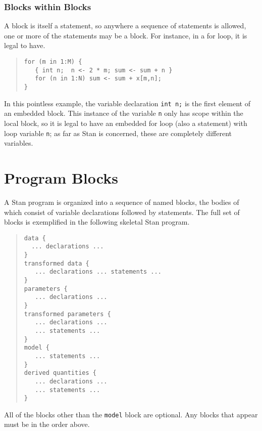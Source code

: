 \documentclass[10pt]{report}
\newcommand{\Stan}{Stan\xspace}
\newcommand{\code}[1]{{\tt #1}}
\begin{document}
\subsection{Blocks within Blocks}

A block is itself a statement, so anywhere a sequence of statements is
allowed, one or more of the statements may be a block.  For instance,
in a for loop, it is legal to have.
%
\begin{quote}
\begin{Verbatim}
for (m in 1:M) {
   { int n;  n <- 2 * m; sum <- sum + n }
   for (n in 1:N) sum <- sum + x[m,n];
}
\end{Verbatim}
\end{quote}
%
In this pointless example, the variable declaration \code{int n;} is
the first element of an embedded block.  This instance of the variable
\code{n} only has scope within the local block, so it is legal to have
an embedded for loop (also a statement) with loop variable \code{n};
as far as \Stan is concerned, these are completely different
variables.



\chapter{Program Blocks}\label{blocks.chapter}

A \Stan program is organized into a sequence of named blocks, the
bodies of which consist of variable declarations followed by
statements.  The full set of blocks is exemplified in the following
skeletal \Stan program.
%
\begin{quote}
\begin{Verbatim} 
data { 
  ... declarations ...
}
transformed data { 
   ... declarations ... statements ... 
}
parameters { 
   ... declarations ... 
}
transformed parameters { 
   ... declarations ...
   ... statements ...
}
model { 
   ... statements ...
}
derived quantities {
   ... declarations ...
   ... statements ...
}
\end{Verbatim}
\end{quote}
%
All of the blocks other than the \code{model} block are optional.  Any
blocks that appear must be in the order above.
\end{document}
